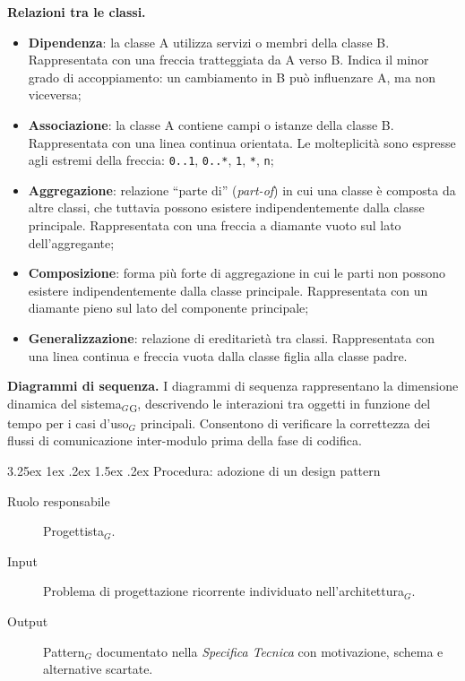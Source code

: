 \documentclass[a4paper, 10pt]{article}
\makeatletter
\renewcommand\paragraph{\@startsection{paragraph}{4}{\z@}%
  {3.25ex \@plus1ex \@minus .2ex}%
  {1.5ex \@plus .2ex}%
  {\normalfont\normalsize\bfseries}}
\makeatother
\begin{document}
\textbf{Relazioni tra le classi.}
\begin{itemize}
    \item \textbf{Dipendenza}: la classe A utilizza servizi o membri della classe B. Rappresentata con una freccia tratteggiata da A verso B. Indica il minor grado di accoppiamento: un cambiamento in B può influenzare A, ma non viceversa;
    \item \textbf{Associazione}: la classe A contiene campi o istanze della classe B. Rappresentata con una linea continua orientata. Le molteplicità sono espresse agli estremi della freccia: \texttt{0..1}, \texttt{0..*}, \texttt{1}, \texttt{*}, \texttt{n};
    \item \textbf{Aggregazione}: relazione ``parte di'' (\textit{part-of}) in cui una classe è composta da altre classi, che tuttavia possono esistere indipendentemente dalla classe principale. Rappresentata con una freccia a diamante vuoto sul lato dell'aggregante;
    \item \textbf{Composizione}: forma più forte di aggregazione in cui le parti non possono esistere indipendentemente dalla classe principale. Rappresentata con un diamante pieno sul lato del componente principale;
    \item \textbf{Generalizzazione}: relazione di ereditarietà tra classi. Rappresentata con una linea continua e freccia vuota dalla classe figlia alla classe padre.
\end{itemize}

\textbf{Diagrammi di sequenza.} I diagrammi di sequenza rappresentano la dimensione dinamica del sistema$_G$\textsubscript{G}, descrivendo le interazioni tra oggetti in funzione del tempo per i casi d'uso$_G$ principali. Consentono di verificare la correttezza dei flussi di comunicazione inter-modulo prima della fase di codifica.

\paragraph{Procedura: adozione di un design pattern}

\begin{description}
    \item[Ruolo responsabile] Progettista$_G$.
    \item[Input] Problema di progettazione ricorrente individuato nell'architettura$_G$.
    \item[Output] Pattern$_G$ documentato nella \textit{Specifica Tecnica} con motivazione, schema e alternative scartate.
\end{description}
\end{document}
